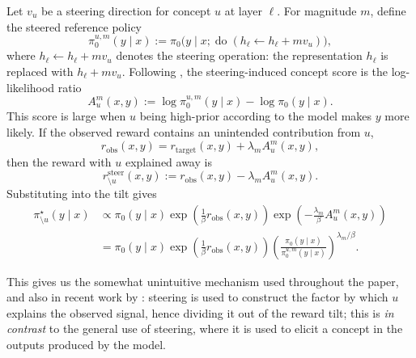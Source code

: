 \documentclass{article} %
\newcommand{\pizero}{\pi_0}
\newcommand{\pistar}{\pi^\star}
\newcommand{\Robs}{r_{\text{obs}}}
\newcommand{\Rtarget}{r_{\text{target}}}
\newcommand{\Rminus}{r_{\setminus u}}
\newcommand{\Au}{A_u}
\begin{document}
Let $v_u$ be a steering direction for concept $u$ at layer $\ell$. 
% 
For magnitude $m$, define the steered reference policy
% 
\begin{equation}
\label{eq:steered-policy}
    \pizero^{u,m}(y \mid x) := \pizero\bigl(y \mid x; \operatorname{do}(h_\ell \leftarrow h_\ell + m v_u)\bigr),
\end{equation}
% 
where $h_\ell \leftarrow h_\ell + m v_u$ denotes the steering operation: the representation $h_\ell$ is replaced with $h_\ell + m v_u$.
% 
Following \cite{bigelow2025belief}, the steering-induced concept score is the log-likelihood ratio
\begin{equation}
    \Au^m(x,y)
    :=
    \log \pizero^{u,m}(y \mid x)
    -
    \log \pizero(y \mid x).
    \label{eq:steer-score}
\end{equation}
This score is large when $u$ being high-prior according to the model makes $y$ more likely. 
% 
If the observed reward contains an unintended contribution from $u$,
\begin{equation}
    \Robs(x,y)
    =
    \Rtarget(x,y) + \lambda_m \Au^m(x,y),
    \label{eq:steer-decomp}
\end{equation}
then the reward with $u$ explained away is
\begin{equation}
    \Rminus^{\text{steer}}(x,y)
    :=
    \Robs(x,y) - \lambda_m \Au^m(x,y).
    \label{eq:steer-reward}
\end{equation}
Substituting into the tilt gives
\begin{align}
    \pistar_{\setminus u}(y \mid x)
    &\propto
    \pizero(y \mid x)
    \exp\left(\frac{1}{\beta}\Robs(x,y)\right)
    \exp\left(-\frac{\lambda_m}{\beta}\Au^m(x,y)\right) \\
    &=
    \pizero(y \mid x)
    \exp\left(\frac{1}{\beta}\Robs(x,y)\right)
    \left(
        \frac{\pizero(y \mid x)}{\pizero^{u,m}(y \mid x)}
    \right)^{\lambda_m/\beta}.
    \label{eq:steer-divide-factor}
\end{align}

This gives us the somewhat unintuitive mechanism used throughout the paper, and also in recent work by \cite{chen2025persona}:  steering is used to construct the factor by which $u$ explains the observed signal, hence dividing it out of the reward tilt; this is \textit{in contrast} to the general use of steering, where it is used to elicit a concept in the outputs produced by the model.
\end{document}
